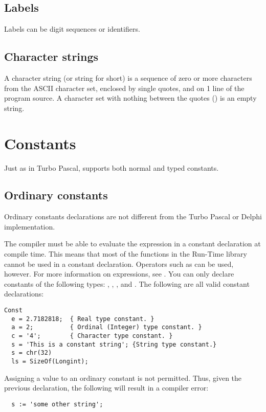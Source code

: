\documentclass{report}
\begin{document}
\section{Labels}
Labels can be digit sequences or identifiers.



\section{Character strings}
A character string (or string for short) is a sequence of zero or more
characters from the ASCII character set, enclosed by single quotes, and on 1
line of the program source.
A character set with nothing between the quotes () is an empty
string.

\chapter{Constants}
Just as in Turbo Pascal, \fpc supports both normal and typed constants.

\section{Ordinary constants}
Ordinary constants declarations are not different from the Turbo Pascal or
Delphi implementation.

The compiler must be able to evaluate the expression in a constant
declaration at compile time.  This means that most of the functions
in the Run-Time library cannot be used in a constant declaration.
Operators such as  can be used, however. For more information on expressions, see
.
You can only declare constants of the following types: ,
, , and .
The following are all valid constant declarations:
\begin{verbatim}
Const
  e = 2.7182818;  { Real type constant. }
  a = 2;          { Ordinal (Integer) type constant. }
  c = '4';        { Character type constant. }
  s = 'This is a constant string'; {String type constant.}
  s = chr(32)
  ls = SizeOf(Longint);
\end{verbatim}
Assigning a value to an ordinary constant is not permitted. 
Thus, given the previous declaration, the following will result 
in a compiler error:
\begin{verbatim}
  s := 'some other string';
\end{verbatim}
\end{document}
